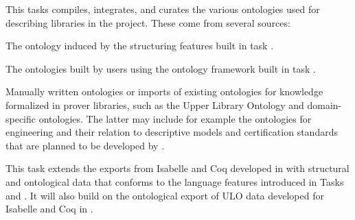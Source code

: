 \begin{workpackage}[id=structuring,type=RTD,
  short={Structure of the encyclopedia},%
  title={Structure of the encyclopedia},
  lead=FAU,
  SacRM=40,
  FauRM=20,
  BolRM=4
]
\begin{tasklist}

\begin{task}[id=strrefonto,title=Reference Ontology,lead=Sac,FauRM=6,SacRM=6,wphases=12-36!.5]
This tasks compiles, integrates, and curates the various ontologies used for describing libraries in the project.
These come from several sources:
\begin{compactitem}
 \item The ontology induced by the structuring features built in task .
 \item The ontologies built by users using the ontology framework built in task .
 \item Manually written ontologies or imports of existing ontologies for knowledge formalized in prover libraries, such as the Upper Library Ontology \cite{CKMRSW:ulo:19} and domain-specific ontologies.
 The latter may include for example the ontologies for engineering and their relation to descriptive models and certification standards that are planned to be developed by .
\end{compactitem}
\end{task}

\begin{task}[id=strontorepml,title=Ontological Representation of Formal Libraries,lead=Fau,FauRM=6,BolRM=4,SacRM=4,wphases=12-48!.5]
This task extends the exports from Isabelle and Coq developed in  with structural and ontological data that conforms to the language features introduced in Tasks~ and .
It will also build on the ontological export of ULO data developed for Isabelle and Coq in \cite{CKMRSW:ulo:19}.


\end{task}
\end{tasklist}
\end{workpackage}
